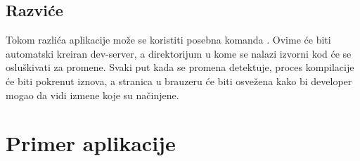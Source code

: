 \subsection{Razviće}

Tokom razlića aplikacije može se koristiti posebna komanda .
Ovime će biti automatski kreiran dev-server, a  direktorijum u kome se nalazi izvorni kod će se osluškivati za promene.
Svaki put kada se promena detektuje, proces kompilacije će biti pokrenut iznova, a stranica u brauzeru će biti osvežena kako bi developer mogao da vidi izmene koje su načinjene.

\section{Primer aplikacije}

